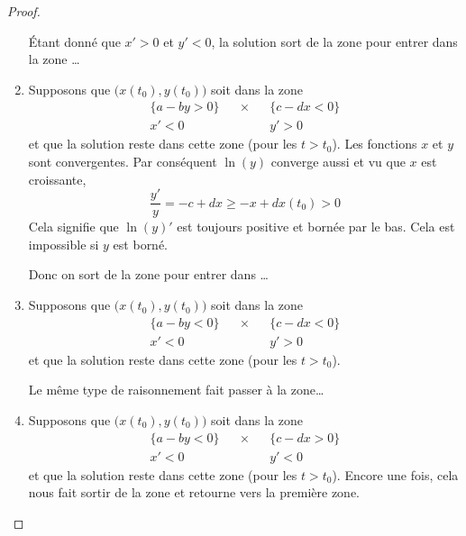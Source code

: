 \begin{proof}
\begin{subproof}
\begin{enumerate}
			      Étant donné que \( x'>0\) et \( y'<0\), la solution sort de la zone pour entrer dans la zone \ldots
			\item
			      Supposons que \( \big( x(t_0),y(t_0) \big) \) soit dans la zone
			      \begin{subequations}
				      \begin{align}
					      \{ a-by>0 \} &  & \times &  & \{ c-dx<0 \} \\
					      x'<0         &  &        &  & y'>0
				      \end{align}
			      \end{subequations}
			      et que la solution reste dans cette zone (pour les \( t>t_0\)). Les fonctions \( x\) et \( y\) sont convergentes. Par conséquent \( \ln(y)\) converge aussi et vu que \( x\) est croissante,
			      \begin{equation}
				      \frac{ y' }{ y }=-c+dx\geq -x+dx(t_0)>0
			      \end{equation}
			      Cela signifie que \( \ln(y)'\) est toujours positive et bornée par le bas. Cela est impossible si \( y\) est borné.

			      Donc on sort de la zone pour entrer dans \ldots
			\item
			      Supposons que \( \big( x(t_0),y(t_0) \big) \) soit dans la zone
			      \begin{subequations}
				      \begin{align}
					      \{ a-by<0 \} &  & \times &  & \{ c-dx<0 \} \\
					      x'<0         &  &        &  & y'>0
				      \end{align}
			      \end{subequations}
			      et que la solution reste dans cette zone (pour les \( t>t_0\)).

			      Le même type de raisonnement fait passer à la zone\ldots
			\item
			      Supposons que \( \big( x(t_0),y(t_0) \big) \) soit dans la zone
			      \begin{subequations}
				      \begin{align}
					      \{ a-by<0 \} &  & \times &  & \{ c-dx>0 \} \\
					      x'<0         &  &        &  & y'<0
				      \end{align}
			      \end{subequations}
			      et que la solution reste dans cette zone (pour les \( t>t_0\)). Encore une fois, cela nous fait sortir de la zone et retourne vers la première zone.
		\end{enumerate}


\end{subproof}
\end{proof}
